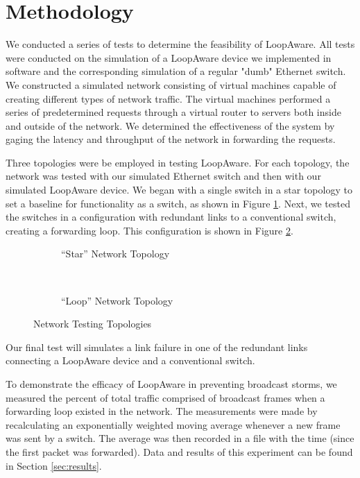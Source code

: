 \section{Methodology}
\label{sec:methodology}
    We conducted a series of tests to determine the feasibility of LoopAware.
    All tests were conducted on the simulation of a LoopAware device we implemented in software and the corresponding simulation of a regular "dumb" Ethernet switch.
    We constructed a simulated network consisting of virtual machines capable of creating different types of network traffic.
    The virtual machines performed a series of predetermined requests through a virtual router to servers both inside and outside of the network.
    We determined the effectiveness of the system by gaging the latency and throughput of the network in forwarding the requests.

    Three topologies were be employed in testing LoopAware.
    For each topology, the network was tested with our simulated Ethernet switch and then with our simulated LoopAware device.
    We began with a single switch in a star topology to set a baseline for functionality as a switch, as shown in Figure \ref{fig:startop}.
    Next, we tested the switches in a configuration with redundant links to a conventional switch, creating a forwarding loop.
    This configuration is shown in Figure \ref{fig:looptop}.
    \begin{figure}[ht]
        \centering
        \begin{subfigure}[b]{0.4\textwidth}
            \centering
            
            \label{fig:startop}
            \caption{``Star'' Network Topology}
        \end{subfigure}
        ~~~~~~~~~~~~~~~
        \begin{subfigure}[b]{0.4\textwidth}
            \centering
            
            \label{fig:looptop}
            \caption{``Loop'' Network Topology}
        \end{subfigure}
        \label{fig:topologies}
        \caption{Network Testing Topologies}
    \end{figure}
    Our final test will simulates a link failure in one of the redundant links connecting a LoopAware device and a conventional switch.

    To demonstrate the efficacy of LoopAware in preventing broadcast storms, we measured the percent of total traffic comprised of broadcast frames when a forwarding loop existed in the network.
    The measurements were made by recalculating an exponentially weighted moving average whenever a new frame was sent by a switch.
    The average was then recorded in a file with the time (since the first packet was forwarded).
    Data and results of this experiment can be found in Section \ref{sec:results}.

